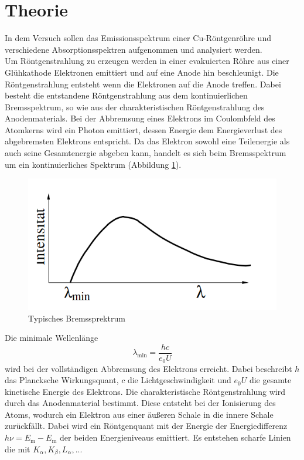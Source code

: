 \section{Theorie}
\label{sec:Theorie}
In dem Versuch sollen das Emissionsspektrum einer Cu-Röntgenröhre und verschiedene Absorptionsspektren aufgenommen und analysiert werden.
\\
Um Röntgenstrahlung zu erzeugen werden in einer evakuierten Röhre aus einer Glühkathode Elektronen emittiert und auf eine Anode hin beschleunigt. 
Die Röntgenstrahlung entsteht wenn die Elektronen auf die Anode treffen. Dabei besteht die entstandene Röntgenstrahlung aus dem kontinuierlichen
 Bremsspektrum, so wie aus der charakteristischen Röntgenstrahlung des Anodenmaterials. 
 Bei der Abbremsung eines Elektrons im Coulombfeld des Atomkerns wird ein Photon emittiert, dessen Energie dem Energieverlust des abgebremsten Elektrons entspricht.
 Da das Elektron sowohl eine Teilenergie als auch seine Gesamtenergie abgeben kann, handelt es sich beim Bremsspektrum um ein kontinuierliches Spektrum (Abbildung \ref{fig:Brems}).
 \begin{figure}
    \centering
    \caption{Typisches Bremssprektrum \cite{}}
    \label{fig:Brems}
    \includegraphics[width = 0.6 \textwidth]{pics/Bremsspe.png}
\end{figure}
 Die minimale Wellenlänge 
 \begin{equation}
     \lambda_\text{min}=\frac{h c}{e_0 U}
     \label{eqn:lammin}
 \end{equation}
 wird bei der vollständigen Abbremsung des Elektrons erreicht.
 Dabei beschreibt $h$ das Plancksche Wirkungsquant, $c$ die Lichtgeschwindigkeit und $e_0 U$ die gesamte kinetische Energie des Elektrons.
 Die charakteristische Röntgenstrahlung wird durch das Anodenmaterial bestimmt. Diese entsteht bei der Ionisierung des Atoms, wodurch ein Elektron aus einer äußeren Schale in die innere Schale zurückfällt.
 Dabei wird ein Röntgenquant mit der Energie der Energiedifferenz $h \nu = E_\text{m}-E_\text{m}$ der beiden Energieniveaus emittiert. Es entstehen scharfe Linien die mit $K_\alpha, K_\beta, L_\alpha, ...$ 
